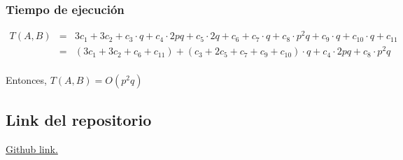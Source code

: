 \documentclass[12pt]{article}
\begin{document}
\subsubsection*{Tiempo de ejecución}

\begin{eqnarray*}
T(A,B)&=&3c_1+3c_2+c_3\cdot q+c_4\cdot 2pq+c_5\cdot 2q+c_6+c_7\cdot q+c_8\cdot p^2q+c_9\cdot q+c_{10}\cdot q+c_{11}\\
&=&(3c_1+3c_2+c_6+c_{11})+(c_3+2c_5+c_7+c_9+c_{10})\cdot q+c_4\cdot 2pq+c_8\cdot p^2q\\
\end{eqnarray*}

\noindent Entonces, $T(A,B) = O(p^2q)$


\subsection*{Link del repositorio}
\noindent \href{https://www.github.com/DiegoELT/ADAProject}{Github link.}
\end{document}
